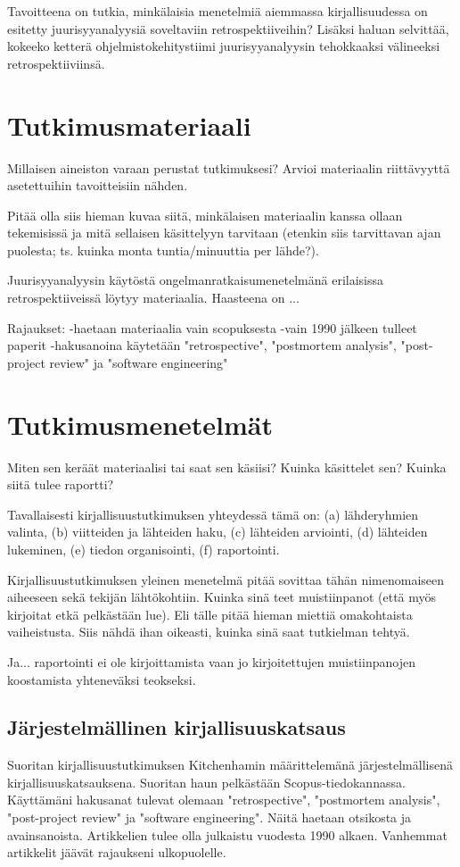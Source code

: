 \documentclass[12pt,a4paper,finnish,oneside]{article}
\begin{document}
Tavoitteena on tutkia, minkälaisia menetelmiä aiemmassa kirjallisuudessa on esitetty juurisyyanalyysiä soveltaviin retrospektiiveihin? Lisäksi haluan selvittää, kokeeko ketterä ohjelmistokehitystiimi juurisyyanalyysin tehokkaaksi välineeksi retrospektiiviinsä.

\section{Tutkimusmateriaali}

Millaisen aineiston varaan perustat tutkimuksesi? Arvioi materiaalin
riittävyyttä asetettuihin tavoitteisiin nähden.

Pitää olla siis hieman kuvaa siitä, minkälaisen materiaalin kanssa
ollaan tekemisissä ja mitä sellaisen käsittelyyn tarvitaan (etenkin
siis tarvittavan ajan puolesta; ts. kuinka monta tuntia/minuuttia per
lähde?).

Juurisyyanalyysin käytöstä ongelmanratkaisumenetelmänä erilaisissa retrospektiiveissä löytyy materiaalia. Haasteena on ...

Rajaukset:
-haetaan materiaalia vain scopuksesta
-vain 1990 jälkeen tulleet paperit
-hakusanoina käytetään "retrospective", "postmortem analysis", "post-project review" ja "software engineering"

\section{Tutkimusmenetelmät}

Miten sen keräät materiaalisi tai saat sen käsiisi? Kuinka käsittelet
sen? Kuinka siitä tulee raportti?

Tavallaisesti kirjallisuustutkimuksen yhteydessä tämä on:
(a) lähderyhmien valinta,
(b) viitteiden ja lähteiden haku,
(c) lähteiden arviointi,
(d) lähteiden lukeminen,
(e) tiedon organisointi,
(f) raportointi.  %

Kirjallisuustutkimuksen yleinen menetelmä pitää sovittaa tähän
nimenomaiseen aiheeseen sekä tekijän lähtökohtiin. Kuinka sinä teet
muistiinpanot (että myös kirjoitat etkä pelkästään lue). Eli tälle
pitää hieman miettiä omakohtaista vaiheistusta. Siis nähdä ihan
oikeasti, kuinka sinä saat tutkielman tehtyä.

Ja... raportointi ei ole kirjoittamista vaan jo kirjoitettujen
muistiinpanojen koostamista yhteneväksi teokseksi.

\subsection{Järjestelmällinen kirjallisuuskatsaus}
Suoritan kirjallisuustutkimuksen Kitchenhamin määrittelemänä järjestelmällisenä kirjallisuuskatsauksena. Suoritan haun pelkästään Scopus-tiedokannassa. Käyttämäni hakusanat tulevat olemaan "retrospective", "postmortem analysis", "post-project review" ja "software engineering". Näitä haetaan otsikosta ja avainsanoista. Artikkelien tulee olla julkaistu vuodesta 1990 alkaen. Vanhemmat artikkelit jäävät rajaukseni ulkopuolelle.
\end{document}
